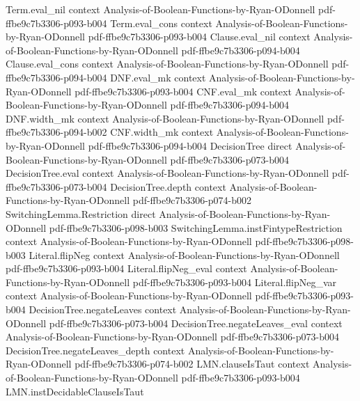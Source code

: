 \begin{lemma}
  {Term.eval_nil}
  {context}
  {Analysis-of-Boolean-Functions-by-Ryan-ODonnell}
  {pdf-ffbe9c7b3306-p093-b004}
\proofstep
  {Term.eval_cons}
  {context}
  {Analysis-of-Boolean-Functions-by-Ryan-ODonnell}
  {pdf-ffbe9c7b3306-p093-b004}
\proofstep
  {Clause.eval_nil}
  {context}
  {Analysis-of-Boolean-Functions-by-Ryan-ODonnell}
  {pdf-ffbe9c7b3306-p094-b004}
\proofstep
  {Clause.eval_cons}
  {context}
  {Analysis-of-Boolean-Functions-by-Ryan-ODonnell}
  {pdf-ffbe9c7b3306-p094-b004}
\proofstep
  {DNF.eval_mk}
  {context}
  {Analysis-of-Boolean-Functions-by-Ryan-ODonnell}
  {pdf-ffbe9c7b3306-p093-b004}
\proofstep
  {CNF.eval_mk}
  {context}
  {Analysis-of-Boolean-Functions-by-Ryan-ODonnell}
  {pdf-ffbe9c7b3306-p094-b004}
\proofstep
  {DNF.width_mk}
  {context}
  {Analysis-of-Boolean-Functions-by-Ryan-ODonnell}
  {pdf-ffbe9c7b3306-p094-b002}
\proofstep
  {CNF.width_mk}
  {context}
  {Analysis-of-Boolean-Functions-by-Ryan-ODonnell}
  {pdf-ffbe9c7b3306-p094-b004}
\proofstep
  {DecisionTree}
  {direct}
  {Analysis-of-Boolean-Functions-by-Ryan-ODonnell}
  {pdf-ffbe9c7b3306-p073-b004}
\proofstep
  {DecisionTree.eval}
  {context}
  {Analysis-of-Boolean-Functions-by-Ryan-ODonnell}
  {pdf-ffbe9c7b3306-p073-b004}
\proofstep
  {DecisionTree.depth}
  {context}
  {Analysis-of-Boolean-Functions-by-Ryan-ODonnell}
  {pdf-ffbe9c7b3306-p074-b002}
\proofstep
  {SwitchingLemma.Restriction}
  {direct}
  {Analysis-of-Boolean-Functions-by-Ryan-ODonnell}
  {pdf-ffbe9c7b3306-p098-b003}
\proofstep
  {SwitchingLemma.instFintypeRestriction}
  {context}
  {Analysis-of-Boolean-Functions-by-Ryan-ODonnell}
  {pdf-ffbe9c7b3306-p098-b003}
\proofstep
  {Literal.flipNeg}
  {context}
  {Analysis-of-Boolean-Functions-by-Ryan-ODonnell}
  {pdf-ffbe9c7b3306-p093-b004}
\proofstep
  {Literal.flipNeg_eval}
  {context}
  {Analysis-of-Boolean-Functions-by-Ryan-ODonnell}
  {pdf-ffbe9c7b3306-p093-b004}
\proofstep
  {Literal.flipNeg_var}
  {context}
  {Analysis-of-Boolean-Functions-by-Ryan-ODonnell}
  {pdf-ffbe9c7b3306-p093-b004}
\proofstep
  {DecisionTree.negateLeaves}
  {context}
  {Analysis-of-Boolean-Functions-by-Ryan-ODonnell}
  {pdf-ffbe9c7b3306-p073-b004}
\proofstep
  {DecisionTree.negateLeaves_eval}
  {context}
  {Analysis-of-Boolean-Functions-by-Ryan-ODonnell}
  {pdf-ffbe9c7b3306-p073-b004}
\proofstep
  {DecisionTree.negateLeaves_depth}
  {context}
  {Analysis-of-Boolean-Functions-by-Ryan-ODonnell}
  {pdf-ffbe9c7b3306-p074-b002}
\proofstep
  {LMN.clauseIsTaut}
  {context}
  {Analysis-of-Boolean-Functions-by-Ryan-ODonnell}
  {pdf-ffbe9c7b3306-p093-b004}
\proofstep
  {LMN.instDecidableClauseIsTaut}

\end{lemma}
